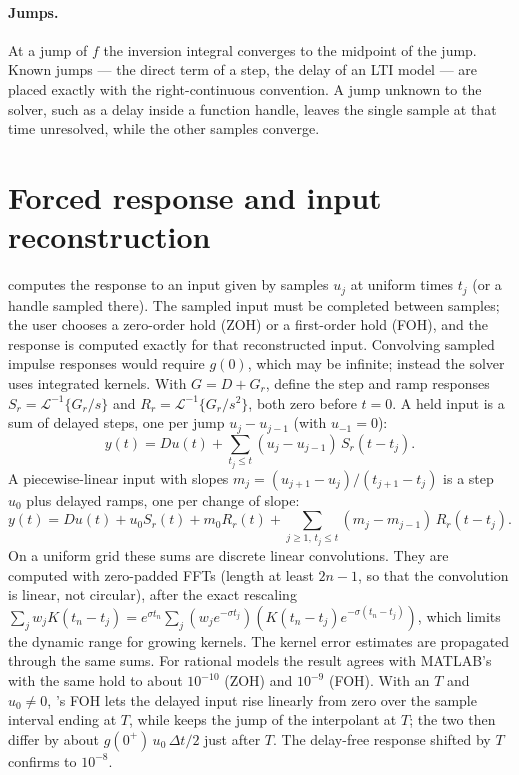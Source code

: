 \paragraph{Jumps.} At a jump of $f$ the inversion integral converges to the
midpoint of the jump. Known jumps --- the direct term of a step, the delay
of an LTI model --- are placed exactly with the right-continuous
convention. A jump unknown to the solver, such as a delay inside a function
handle, leaves the single sample at that time unresolved, while the other
samples converge.

\section{Forced response and input reconstruction}

 computes the response to an input given by samples $u_j$ at
uniform times $t_j$ (or a handle sampled there). The sampled input must be
completed between samples; the user chooses a zero-order hold (ZOH) or a
first-order hold (FOH), and the response is computed exactly for that
reconstructed input. Convolving sampled impulse responses would require
$g(0)$, which may be infinite; instead the solver uses integrated kernels.
With $G=D+G_r$, define the step and ramp responses
$S_r=\mathcal L^{-1}\{G_r/s\}$ and $R_r=\mathcal L^{-1}\{G_r/s^2\}$, both
zero before $t=0$. A held input is a sum of delayed steps, one per jump
$u_j-u_{j-1}$ (with $u_{-1}=0$):
\begin{equation}\label{eq:zoh-sum}
  y(t)=Du(t)+\sum_{t_j\le t}(u_j-u_{j-1})\,S_r(t-t_j).
\end{equation}
A piecewise-linear input with slopes $m_j=(u_{j+1}-u_j)/(t_{j+1}-t_j)$ is a
step $u_0$ plus delayed ramps, one per change of slope:
\begin{equation}
  y(t)=Du(t)+u_0S_r(t)+m_0R_r(t)+\sum_{j\ge1,\,t_j\le t}(m_j-m_{j-1})\,R_r(t-t_j).
\end{equation}
On a uniform grid these sums are discrete linear convolutions. They are
computed with zero-padded FFTs (length at least $2n-1$, so that the
convolution is linear, not circular), after the exact rescaling
$\sum_j w_jK(t_n-t_j)=e^{\sigma t_n}\sum_j (w_je^{-\sigma t_j})
(K(t_n-t_j)e^{-\sigma(t_n-t_j)})$, which limits the dynamic range for
growing kernels. The kernel error estimates are propagated through the same
sums. For rational models the result agrees with MATLAB's  with
the same hold to about $10^{-10}$ (ZOH) and $10^{-9}$ (FOH). With an
 $T$ and $u_0\ne0$, 's FOH lets the delayed input
rise linearly from zero over the sample interval ending at $T$, while
 keeps the jump of the interpolant at $T$; the two then differ
by about $g(0^+)\,u_0\,\Delta t/2$ just after $T$. The delay-free response
shifted by $T$ confirms  to $10^{-8}$.

